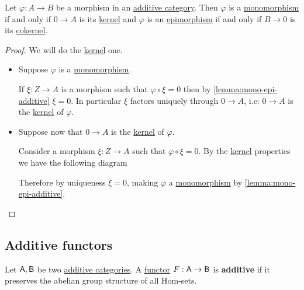 \documentclass[../../../main]{subfiles}
\begin{document}
\begin{lemma} \label{lemma:partial-sequence-additive}
  Let \(\varphi: A \to B\) be a morphism in an \hyperref[def:additive-category]{additive category}. Then \(\varphi\) is a \hyperref[def:mono-epi-morphism]{monomorphism} if and only if \(0 \to A\) is its \hyperref[def:categorical-kernel]{kernel} and \(\varphi\) is an \hyperref[def:mono-epi-morphism]{epimorphism} if and only if \(B \to 0\) is its \hyperref[def:categorical-cokernel]{cokernel}.
\end{lemma}
\begin{proof}
  We will do the \hyperref[def:categorical-kernel]{kernel} one.
  \begin{itemize}
    \item[\(\implies\)] Suppose \(\varphi\) is a \hyperref[def:mono-epi-morphism]{monomorphism}.

          If \(\xi: Z \to A\) is a morphism such that \(\varphi \circ \xi = 0\) then by \autoref{lemma:mono-epi-additive} \(\xi = 0\).
          In particular \(\xi\) factors uniquely through \(0 \to A\), i.e: \(0 \to A\) is the \hyperref[def:categorical-kernel]{kernel} of \(\varphi\).
    \item[\(\impliedby\)] Suppose now that \(0 \to A\) is the \hyperref[def:categorical-kernel]{kernel} of \(\varphi\).

          Consider a morphism \(\xi: Z \to A\) such that \(\varphi \circ \xi = 0\).
          By the \hyperref[def:categorical-kernel]{kernel} properties we have the following diagram
          \begin{center}
          \end{center}
          Therefore by uniqueness \(\xi = 0\), making \(\varphi\) a \hyperref[def:mono-epi-morphism]{monomorphism} by \autoref{lemma:mono-epi-additive}.
  \end{itemize}
\end{proof}

\subsection{Additive functors}
\begin{definition} \label{def:additive-functor}
  Let \(\mathsf{A}, \mathsf{B}\) be two \hyperref[def:additive-category]{additive categories}. A \hyperref[def:functor]{functor} \(F: \mathsf{A} \to \mathsf{B}\) is \textbf{additive} if it preserves the abelian group structure of all Hom-sets.
\end{definition}
\end{document}
